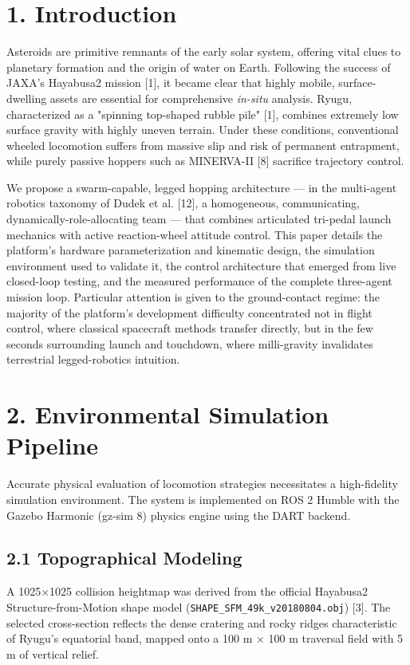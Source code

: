 \documentclass[conference]{IEEEtran}
\begin{document}
\section*{1. Introduction}

Asteroids are primitive remnants of the early solar system, offering vital clues to planetary formation and the origin of water on Earth. Following the success of JAXA's Hayabusa2 mission [1], it became clear that highly mobile, surface-dwelling assets are essential for comprehensive \emph{in-situ} analysis. Ryugu, characterized as a "spinning top-shaped rubble pile" [1], combines extremely low surface gravity with highly uneven terrain. Under these conditions, conventional wheeled locomotion suffers from massive slip and risk of permanent entrapment, while purely passive hoppers such as MINERVA-II [8] sacrifice trajectory control.

We propose a swarm-capable, legged hopping architecture --- in the multi-agent robotics taxonomy of Dudek et al. [12], a homogeneous, communicating, dynamically-role-allocating team --- that combines articulated tri-pedal launch mechanics with active reaction-wheel attitude control. This paper details the platform's hardware parameterization and kinematic design, the simulation environment used to validate it, the control architecture that emerged from live closed-loop testing, and the measured performance of the complete three-agent mission loop. Particular attention is given to the ground-contact regime: the majority of the platform's development difficulty concentrated not in flight control, where classical spacecraft methods transfer directly, but in the few seconds surrounding launch and touchdown, where milli-gravity invalidates terrestrial legged-robotics intuition.

\section*{2. Environmental Simulation Pipeline}

Accurate physical evaluation of locomotion strategies necessitates a high-fidelity simulation environment. The system is implemented on ROS 2 Humble with the Gazebo Harmonic (gz-sim 8) physics engine using the DART backend.

\subsection*{2.1 Topographical Modeling}

A 1025\ensuremath{\times}1025 collision heightmap was derived from the official Hayabusa2 Structure-from-Motion shape model (\texttt{SHAPE\_SFM\_49k\_v20180804.obj}) [3]. The selected cross-section reflects the dense cratering and rocky ridges characteristic of Ryugu's equatorial band, mapped onto a 100 m \ensuremath{\times} 100 m traversal field with 5 m of vertical relief.
\end{document}
